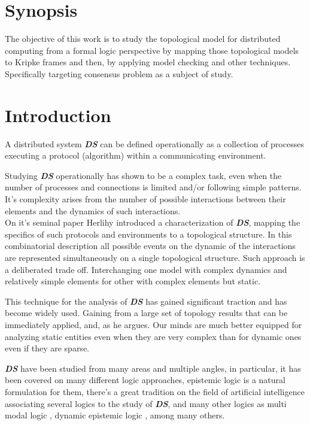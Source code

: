 \documentclass[oneside,openany]{tufte-book} %
\newcommand{\ds}{\textbf{\textit{DS}}\xspace}
\begin{document}
\chapter{Synopsis}

The objective of this work is to study the topological model for distributed computing from a formal logic perspective by mapping those topological models to Kripke frames and then, by applying model checking and other techniques. Specifically targeting consensus problem as a subject of study.

\chapter{Introduction} 

A distributed system \ds can be defined operationally as a collection of 
processes executing a protocol (algorithm) within a communicating environment.

Studying \ds operationally has shown to be a complex task, even when the number 
of processes and connections is limited and/or following simple patterns. 
It's complexity arises from the number of possible interactions between their 
elements and the dynamics of such interactions.\\

On it's seminal paper \cite{Herlihy1999} Herlihy  introduced a characterization of \ds, 
mapping the specifics of such protocols and environments to a topological structure.
In this combinatorial description all possible events on the dynamic of the interactions 
are represented simultaneously on a single topological structure.
Such approach is a deliberated trade off. Interchanging one model with complex 
dynamics and relatively simple elements for other with complex elements but static.

This technique for the analysis of \ds has gained significant traction 
and has become widely used.
Gaining from a large set of topology results that can be immediately applied, and, as 
he argues. Our minds are much better equipped for analyzing static entities even when they are very complex than for dynamic ones even if they are sparse.

\ds have been studied from many areas and multiple angles, in particular, it has been 
covered on many different logic approaches, epistemic logic \cite{Meyer:1995} is a natural formulation for 
them, there's a great tradition on the field of artificial intelligence associating several logics to the study of \ds \cite{HandbookAI1}, and many other logics as multi modal logic \cite{Hintikka1962}, dynamic epistemic logic \cite{Ditmarsch:2007}, among many others.
\end{document}
